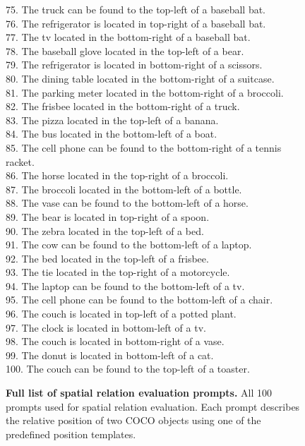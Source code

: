 \begin{figure}[t]
{\begin{minipage}{0.96\textwidth}
\begin{minipage}[t]{0.48\textwidth}
75. The truck can be found to the top-left of a baseball bat.\\
76. The refrigerator is located in top-right of a baseball bat.\\
77. The tv located in the bottom-right of a baseball bat.\\
78. The baseball glove located in the top-left of a bear.\\
79. The refrigerator is located in bottom-right of a scissors.\\
80. The dining table located in the bottom-right of a suitcase.\\
81. The parking meter located in the bottom-right of a broccoli.\\
82. The frisbee located in the bottom-right of a truck.\\
83. The pizza located in the top-left of a banana.\\
84. The bus located in the bottom-left of a boat.\\
85. The cell phone can be found to the bottom-right of a tennis racket.\\
86. The horse located in the top-right of a broccoli.\\
87. The broccoli located in the bottom-left of a bottle.\\
88. The vase can be found to the bottom-left of a horse.\\
89. The bear is located in top-right of a spoon.\\
90. The zebra located in the top-left of a bed.\\
91. The cow can be found to the bottom-left of a laptop.\\
92. The bed located in the top-left of a frisbee.\\
93. The tie located in the top-right of a motorcycle.\\
94. The laptop can be found to the bottom-left of a tv.\\
95. The cell phone can be found to the bottom-left of a chair.\\
96. The couch is located in top-left of a potted plant.\\
97. The clock is located in bottom-left of a tv.\\
98. The couch is located in bottom-right of a vase.\\
99. The donut is located in bottom-left of a cat.\\
100. The couch can be found to the top-left of a toaster.\\
\end{minipage}
\vspace{6pt}
\end{minipage}%
}
\caption{\textbf{Full list of spatial relation evaluation prompts.}
All 100 prompts used for spatial relation evaluation.
Each prompt describes the relative position of two COCO objects using one of the predefined position templates.}
\label{fig:spatial_prompts}
\end{figure}